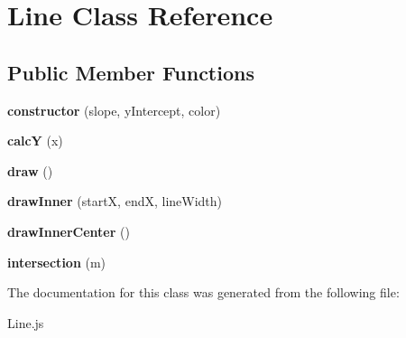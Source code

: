 \hypertarget{class_line}{}\section{Line Class Reference}
\label{class_line}
\subsection*{Public Member Functions}
\begin{DoxyCompactItemize}
\item 
\mbox{\label{class_line_a3275851dc271ae4c5fd5b116f1e01682}} 
{\bfseries constructor} (slope, y\+Intercept, color)
\item 
\mbox{\label{class_line_a263a5335915793a66237a0542a4c53d7}} 
{\bfseries calcY} (x)
\item 
\mbox{\label{class_line_a00951eb9a97cd51f912ece50b2b963d0}} 
{\bfseries draw} ()
\item 
\mbox{\label{class_line_af23b1cb3b57ea982861e0553f792c5d7}} 
{\bfseries draw\+Inner} (startX, endX, line\+Width)
\item 
\mbox{\label{class_line_a9b4b94cd0f636a1987e16e411c226f3e}} 
{\bfseries draw\+Inner\+Center} ()
\item 
\mbox{\label{class_line_a5e242404bd1ab26ddc830318295da199}} 
{\bfseries intersection} (m)
\end{DoxyCompactItemize}


The documentation for this class was generated from the following file\+:\begin{DoxyCompactItemize}
\item 
Line.\+js\end{DoxyCompactItemize}
